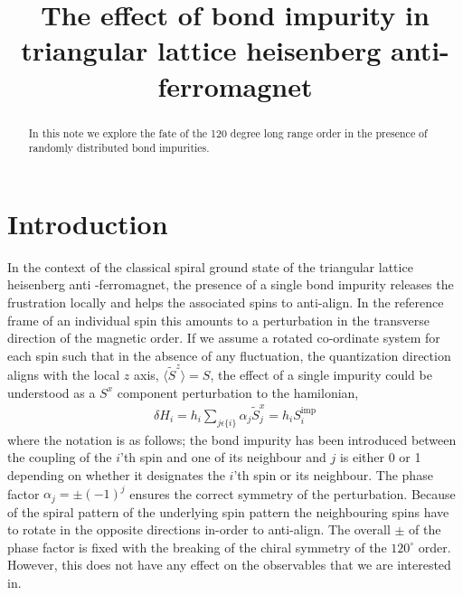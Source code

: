 \documentclass{article}
\newcommand{\tS}{\tilde{S}}
\begin{document}
\title{The effect of bond impurity in triangular
lattice heisenberg anti-ferromagnet}
\maketitle

\begin{abstract}
    In this note we explore the fate of the 120 
    degree long range order in the presence of
    randomly distributed bond impurities.
\end{abstract}

\section{Introduction}
In the context of the classical spiral ground 
state of the triangular lattice heisenberg anti
-ferromagnet, the presence of a single bond 
impurity releases the frustration locally and 
helps the associated spins to anti-align. In 
the reference frame of an individual spin this
amounts to a perturbation in the transverse
direction of the magnetic order. If we assume 
a rotated co-ordinate system for each spin such
that in the absence of any fluctuation, the 
quantization direction aligns with the local $z$ 
axis, $\langle \tS^z\rangle=S$, the effect of a 
single impurity could be understood as a 
$S^x$ component perturbation to the hamilonian,
\begin{equation}
    \begin{aligned}
        \delta H_i =h_i\sum_{j\epsilon\{i\}}
        \alpha_j\tS^x_j
        =h_iS^{\text{imp}}_i
    \end{aligned}
\end{equation}
where the notation is as follows; the bond 
impurity has been introduced between the coupling
of the $i$'th spin and one of its neighbour 
and $j$ is either 0 or 1 depending on whether
it designates the $i$'th spin or its neighbour. 
The phase factor $\alpha_j=\pm(-1)^{j}$ ensures 
the correct symmetry of the perturbation. Because
of the spiral pattern of the underlying spin
pattern the neighbouring spins have to rotate 
in the opposite directions in-order to anti-align.
The overall $\pm$ of the phase factor is fixed
with the breaking of the chiral symmetry of the
$120^\circ$ order. However, this does not have
any effect on the observables that we are interested
in.
\end{document}
